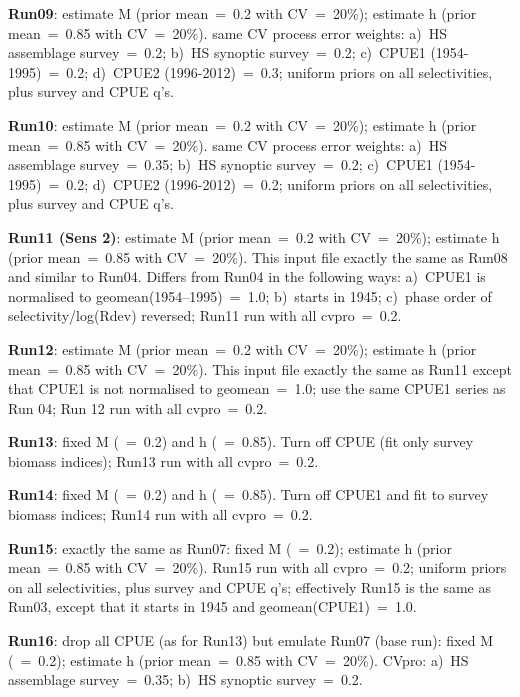 {\bf Run09}: estimate M (prior mean~=~0.2 with CV~=~20\%); estimate h (prior mean~=~0.85 with CV~=~20\%).  same CV process error weights: a)~HS assemblage survey~=~0.2; b)~HS synoptic survey~=~0.2; c)~CPUE1 (1954-1995)~=~0.2; d)~CPUE2 (1996-2012)~=~0.3; uniform priors on all selectivities, plus survey and CPUE q's. \newline

{\bf Run10}: estimate M (prior mean~=~0.2 with CV~=~20\%); estimate h (prior mean~=~0.85 with CV~=~20\%).  same CV process error weights: a)~HS assemblage survey~=~0.35; b)~HS synoptic survey~=~0.2; c)~CPUE1 (1954-1995)~=~0.2; d)~CPUE2 (1996-2012)~=~0.2; uniform priors on all selectivities, plus survey and CPUE q's.    \newline

{\bf Run11 (Sens 2)}: estimate M (prior mean~=~0.2 with CV~=~20\%); estimate h (prior mean~=~0.85 with CV~=~20\%).  This input file exactly the same as Run08 and similar to Run04.  Differs from Run04 in the following ways: a)~CPUE1 is normalised to geomean(1954--1995)~=~1.0; b)~starts in 1945; c)~phase order of selectivity/log(Rdev) reversed; Run11 run with all cvpro~=~0.2.  \newline

{\bf Run12}: estimate M (prior mean~=~0.2 with CV~=~20\%); estimate h (prior mean~=~0.85 with CV~=~20\%).  This input file exactly the same as Run11 except that CPUE1 is not normalised to geomean~=~1.0; use the same CPUE1 series as Run 04; Run 12 run with all cvpro~=~0.2.  \newline

{\bf Run13}: fixed M (~=~0.2) and h (~=~0.85).  Turn off CPUE (fit only survey biomass indices); Run13 run with all cvpro~=~0.2. \newline

{\bf Run14}: fixed M (~=~0.2) and h (~=~0.85).  Turn off CPUE1 and fit to survey biomass indices; Run14 run with all cvpro~=~0.2.  \newline

{\bf Run15}: exactly the same as Run07: fixed M (~=~0.2); estimate h (prior mean~=~0.85 with CV~=~20\%).  Run15 run with all cvpro~=~0.2; uniform priors on all selectivities, plus survey and CPUE q's; effectively Run15 is the same as Run03, except that it starts in 1945 and geomean(CPUE1)~=~1.0.  \newline

{\bf Run16}: drop all CPUE (as for Run13) but emulate Run07 (base run): fixed M (~=~0.2); estimate h (prior mean~=~0.85 with CV~=~20\%).  CVpro: a)~HS assemblage survey~=~0.35; b)~HS synoptic survey~=~0.2. \newline

